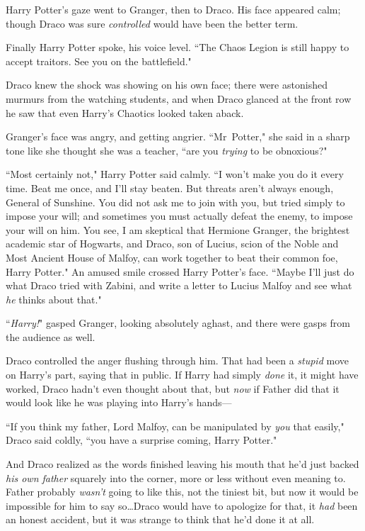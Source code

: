 Harry Potter's gaze went to Granger, then to Draco. His face appeared calm; though Draco was sure \emph{controlled} would have been the better term.

Finally Harry Potter spoke, his voice level. ``The Chaos Legion is still happy to accept traitors. See you on the battlefield."

Draco knew the shock was showing on his own face; there were astonished murmurs from the watching students, and when Draco glanced at the front row he saw that even Harry's Chaotics looked taken aback.

Granger's face was angry, and getting angrier. ``Mr~Potter," she said in a sharp tone like she thought she was a teacher, ``are you \emph{trying} to be obnoxious?"

``Most certainly not," Harry Potter said calmly. ``I won't make you do it every time. Beat me once, and I'll stay beaten. But threats aren't always enough, General of Sunshine. You did not ask me to join with you, but tried simply to impose your will; and sometimes you must actually defeat the enemy, to impose your will on him. You see, I am skeptical that Hermione Granger, the brightest academic star of Hogwarts, and Draco, son of Lucius, scion of the Noble and Most Ancient House of Malfoy, can work together to beat their common foe, Harry Potter." An amused smile crossed Harry Potter's face. ``Maybe I'll just do what Draco tried with Zabini, and write a letter to Lucius Malfoy and see what \emph{he} thinks about that."

``\emph{Harry!}" gasped Granger, looking absolutely aghast, and there were gasps from the audience as well.

Draco controlled the anger flushing through him. That had been a \emph{stupid} move on Harry's part, saying that in public. If Harry had simply \emph{done} it, it might have worked, Draco hadn't even thought about that, but \emph{now} if Father did that it would look like he was playing into Harry's hands—

``If you think my father, Lord Malfoy, can be manipulated by \emph{you} that easily," Draco said coldly, ``you have a surprise coming, Harry Potter."

And Draco realized as the words finished leaving his mouth that he'd just backed \emph{his own father} squarely into the corner, more or less without even meaning to. Father probably \emph{wasn't} going to like this, not the tiniest bit, but now it would be impossible for him to say so…Draco would have to apologize for that, it \emph{had} been an honest accident, but it was strange to think that he'd done it at all.

